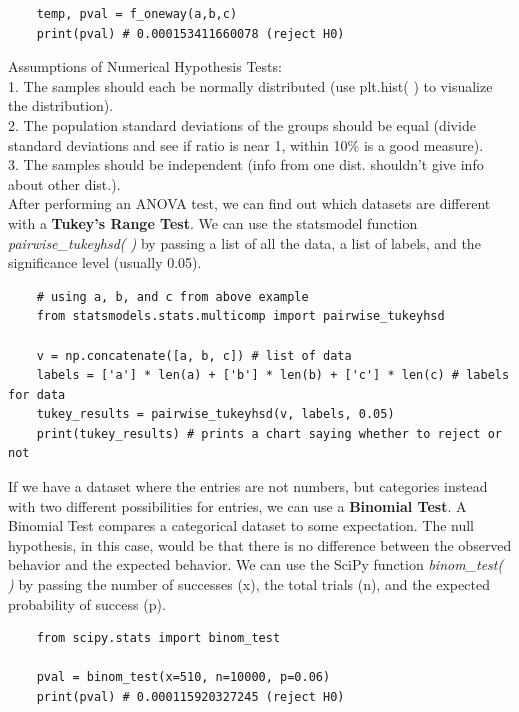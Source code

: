 \documentclass[11pt, a4paper]{article}
\begin{document}
\begin{spacing}{1.1}
\begin{lstlisting}
	temp, pval = f_oneway(a,b,c)
	print(pval) # 0.000153411660078 (reject H0) \end{lstlisting}\vspace*{1mm}
	Assumptions of Numerical Hypothesis Tests: \\
	1. The samples should each be normally distributed (use plt.hist( ) to visualize the distribution). \\
	2. The population standard deviations of the groups should be equal (divide standard deviations and \hspace*{4.5mm} see if ratio is near 1, within 10\% is a good measure).\\
	3. The samples should be independent (info from one dist. shouldn't give info about other dist.). \vspace*{2mm} \\
	After performing an ANOVA test, we can find out which datasets are different with a \textbf{Tukey's Range Test}. We can use the statsmodel function \textit{pairwise\_tukeyhsd( )} by passing a list of all the data, a list of labels, and the significance level (usually 0.05). 
	\begin{lstlisting}
	# using a, b, and c from above example
	from statsmodels.stats.multicomp import pairwise_tukeyhsd
	
	v = np.concatenate([a, b, c]) # list of data
	labels = ['a'] * len(a) + ['b'] * len(b) + ['c'] * len(c) # labels for data
	tukey_results = pairwise_tukeyhsd(v, labels, 0.05)
	print(tukey_results) # prints a chart saying whether to reject or not \end{lstlisting} \newpage
	
	\noindent If we have a dataset where the entries are not numbers, but categories instead with two different possibilities for entries, we can use a \textbf{Binomial Test}. A Binomial Test compares a categorical dataset to some expectation. The null hypothesis, in this case, would be that there is no difference between the observed behavior and the expected behavior. We can use the SciPy function \textit{binom\_test( )} by passing the number of successes (x), the total trials (n), and the expected probability of success (p).
	\begin{lstlisting}
	from scipy.stats import binom_test
	
	pval = binom_test(x=510, n=10000, p=0.06)
	print(pval) # 0.000115920327245 (reject H0)
	

\end{lstlisting}
\end{spacing}
\end{document}

